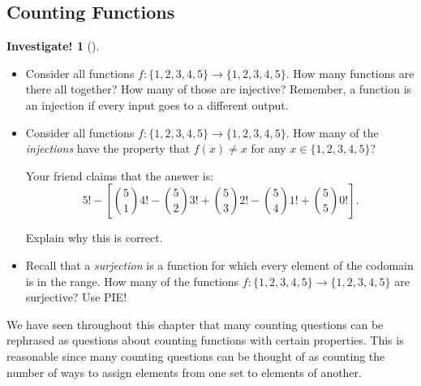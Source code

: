 \documentclass[10pt,]{book}
\theoremstyle{plain}
\theoremstyle{definition}
\theoremstyle{definition}
\theoremstyle{definition}
\newtheorem{investigation}[project]{Investigate!}
\theoremstyle{definition}
\numberwithin{equation}{chapter}
\begin{document}
\subsection[{Counting Functions}]{Counting Functions}\label{subsection-19}
\begin{investigation}[]\label{investigation-9}
\hypertarget{p-874}{}%
%
\begin{itemize}[label=\textbullet]
\item{}\hypertarget{p-875}{}%
Consider all functions \(f: \{1,2,3,4,5\} \to \{1,2,3,4,5\}\). How many functions are there all together? How many of those are injective? Remember, a function is an injection if every input goes to a different output.%
\item{}\hypertarget{p-876}{}%
Consider all functions \(f: \{1,2,3,4,5\} \to \{1,2,3,4,5\}\). How many of the \emph{injections} have the property that \(f(x) \ne x\) for any \(x \in \{1,2,3,4,5\}\)?%
\par
\hypertarget{p-877}{}%
Your friend claims that the answer is:%
\begin{equation*}
5! - \left[ {5\choose 1}4! - {5 \choose 2}3! + {5\choose 3}2! - {5 \choose 4}1! + {5\choose 5}0! \right].
\end{equation*}
%
\par
\hypertarget{p-878}{}%
Explain why this is correct.%
\item{}\hypertarget{p-879}{}%
Recall that a \emph{surjection} is a function for which every element of the codomain is in the range. How many of the functions \(f: \{1,2,3,4,5\} \to \{1,2,3,4,5\}\) are surjective? Use PIE!%
\end{itemize}
%
\end{investigation}
\hypertarget{p-880}{}%
We have seen throughout this chapter that many counting questions can be rephrased as questions about counting functions with certain properties.  This is reasonable since many counting questions can be thought of as counting the number of ways to assign elements from one set to elements of another.%
\end{document}
